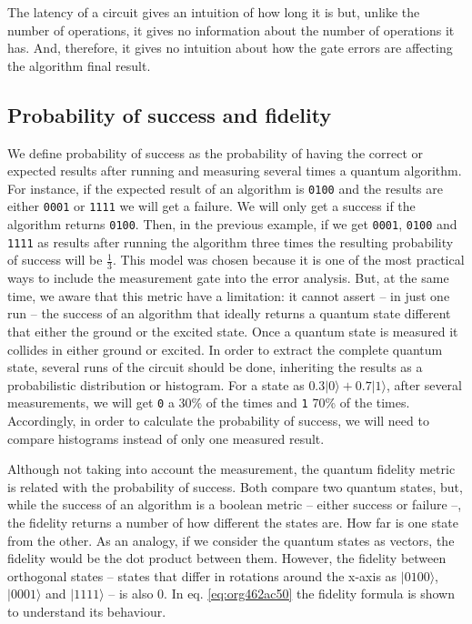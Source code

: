 The latency of a circuit gives an intuition of how long it is but, unlike the number of operations, it gives no information about the number of operations it has.
And, therefore, it gives no intuition about how the gate errors are affecting the algorithm final result.

\subsection{Probability of success and fidelity}
\label{sec:orgefe26e9}

We define probability of success as the probability of having the correct or expected results after running and measuring several times a quantum algorithm.
For instance, if the expected result of an algorithm is \texttt{0100} and the results are either \texttt{0001} or \texttt{1111} we will get a failure.
We will only get a success if the algorithm returns \texttt{0100}.
Then, in the previous example, if we get \texttt{0001}, \texttt{0100} and \texttt{1111} as results after running the algorithm three times the resulting probability of success will be \(\frac{1}{3}\).
This model was chosen because it is one of the most practical ways to include the measurement gate into the error analysis.
But, at the same time, we aware that this metric have a limitation: it cannot assert -- in just one run -- the success of an algorithm that ideally returns a quantum state different that either the ground or the excited state.
Once a quantum state is measured it collides in either ground or excited.
In order to extract the complete quantum state, several runs of the circuit should be done, inheriting the results as a probabilistic distribution or histogram.
For a state as \(0.3 | 0 \rangle + 0.7 | 1 \rangle\), after several measurements, we will get \texttt{0} a 30\% of the times and \texttt{1} 70\% of the times.
Accordingly, in order to calculate the probability of success, we will need to compare histograms instead of only one measured result.

Although not taking into account the measurement, the quantum fidelity metric is related with the probability of success.
Both compare two quantum states, but, while the success of an algorithm is a boolean metric -- either success or failure --, the fidelity returns a number of how different the states are.
How far is one state from the other.
As an analogy, if we consider the quantum states as vectors, the fidelity would be the dot product between them.
However, the fidelity between orthogonal states -- states that differ in rotations around the x-axis as \(| 0100 \rangle\), \(| 0001 \rangle\) and \(| 1111 \rangle\) -- is also 0.
In eq. \ref{eq:org462ac50} the fidelity formula is shown to understand its behaviour.

